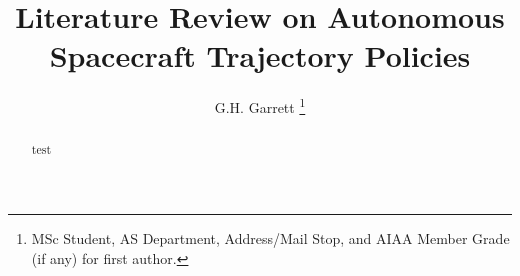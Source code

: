 \documentclass[journal ]{new-aiaa}
\title{Literature Review on Autonomous Spacecraft Trajectory Policies}
\author{G.H. Garrett \footnote{MSc Student, AS Department, Address/Mail Stop, and AIAA Member Grade (if any) for first author.}}
\affil{Business or Academic Affiliation 1, City, State, Zip Code}
\begin{document}
    \maketitle

    \begin{abstract}
        test
    \end{abstract}

% 

    
    
    
%    
%    
%    
%    
%    

    \newpage{}
    
    \newpage

    \appendix
    
    
\end{document}
